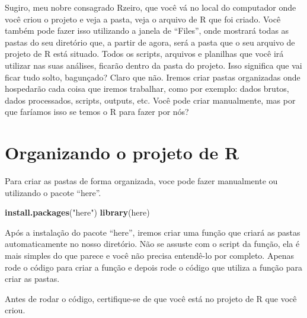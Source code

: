 \documentclass[
]{book}
\newenvironment{Shaded}{\begin{snugshade}}{\end{snugshade}}
\newcommand{\FunctionTok}[1]{\textcolor[rgb]{0.13,0.29,0.53}{\textbf{#1}}}
\newcommand{\NormalTok}[1]{#1}
\newcommand{\StringTok}[1]{\textcolor[rgb]{0.31,0.60,0.02}{#1}}
\begin{document}
Sugiro, meu nobre consagrado Rzeiro, que você vá no local do computador onde você criou o projeto e veja a pasta, veja o arquivo de R que foi criado. Você também pode fazer isso utilizando a janela de ``Files'', onde mostrará todas as pastas do seu diretório que, a partir de agora, será a pasta que o seu arquivo de projeto de R está situado. Todos os scripts, arquivos e planilhas que você irá utilizar nas suas análises, ficarão dentro da pasta do projeto. Isso significa que vai ficar tudo solto, bagunçado? Claro que não. Iremos criar pastas organizadas onde hospedarão cada coisa que iremos trabalhar, como por exemplo: dados brutos, dados processados, scripts, outputs, etc. Você pode criar manualmente, mas por que faríamos isso se temos o R para fazer por nós?

\hypertarget{organizando-o-projeto-de-r}{%
\section{Organizando o projeto de R}\label{organizando-o-projeto-de-r}}

Para criar as pastas de forma organizada, voce pode fazer manualmente ou utilizando o pacote ``here''.

\begin{Shaded}
\begin{Highlighting}[]
\FunctionTok{install.packages}\NormalTok{(}\StringTok{"here"}\NormalTok{)}
\FunctionTok{library}\NormalTok{(here)}
\end{Highlighting}
\end{Shaded}

Após a instalação do pacote ``here'', iremos criar uma função que criará as pastas automaticamente no nosso diretório. Não se assuste com o script da função, ela é mais simples do que parece e você não precisa entendê-lo por completo. Apenas rode o código para criar a função e depois rode o código que utiliza a função para criar as pastas.

Antes de rodar o código, certifique-se de que você está no projeto de R que você criou.
\end{document}
